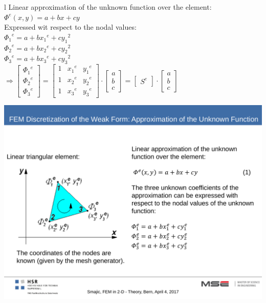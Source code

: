 \begin{minipage}[rt]{12cm}
	\begin{tabular}{l}
		Linear approximation of the unknown function over the element: \\
		\(\displaystyle \Phi^e(x,y) = a + bx + cy \) \\
		Expressed wit respect to the nodal values: \\
		\(\displaystyle {\Phi_1}^e = a + b{x_1}^e + c{y_1}^2 \) \\
		\(\displaystyle {\Phi_2}^e = a + b{x_2}^e + c{y_2}^2 \) \\
		\(\displaystyle {\Phi_3}^e = a + b{x_3}^e + c{y_3}^2 \) \\
		\(\displaystyle \Rightarrow 
			\begin{bmatrix}
				{\Phi_1}^e \\
				{\Phi_2}^e \\
				{\Phi_3}^e
			\end{bmatrix} 
			=
			\begin{bmatrix}
				1 & {x_1}^e & {y_1}^e \\
				1 & {x_2}^e & {y_2}^e \\
				1 & {x_3}^e & {y_3}^e 
			\end{bmatrix}
			\cdot
			\begin{bmatrix}
				a \\
				b \\
				c
			\end{bmatrix}
			= 
			\begin{bmatrix}
				S^e 
			\end{bmatrix}
			\cdot 
			\begin{bmatrix}
				a \\
				b \\
				c
			\end{bmatrix} \) \\
	\end{tabular}
\end{minipage}
\begin{minipage}[lt]{8cm}
	\includegraphics[width=.8\textwidth]{./images/nodes.pdf}\\
\end{minipage}
